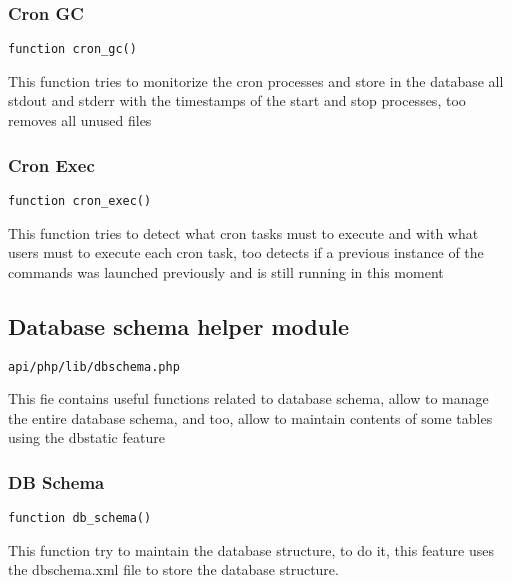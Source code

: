 \documentclass[a4paper]{article}
\begin{document}
\hypertarget{toc405}{}
\subsubsection{Cron GC}

\begin{lstlisting}
function cron_gc()
\end{lstlisting}

This function tries to monitorize the cron processes and store in the database
all stdout and stderr with the timestamps of the start and stop processes, too
removes all unused files

\hypertarget{toc406}{}
\subsubsection{Cron Exec}

\begin{lstlisting}
function cron_exec()
\end{lstlisting}

This function tries to detect what cron tasks must to execute and with what
users must to execute each cron task, too detects if a previous instance of
the commands was launched previously and is still running in this moment

\hypertarget{toc407}{}
\subsection{Database schema helper module}

\begin{lstlisting}
api/php/lib/dbschema.php
\end{lstlisting}

This fie contains useful functions related to database schema, allow to manage the entire database
schema, and too, allow to maintain contents of some tables using the dbstatic feature

\hypertarget{toc408}{}
\subsubsection{DB Schema}

\begin{lstlisting}
function db_schema()
\end{lstlisting}

This function try to maintain the database structure, to do it, this feature uses the dbschema.xml
file to store the database structure.
\end{document}
